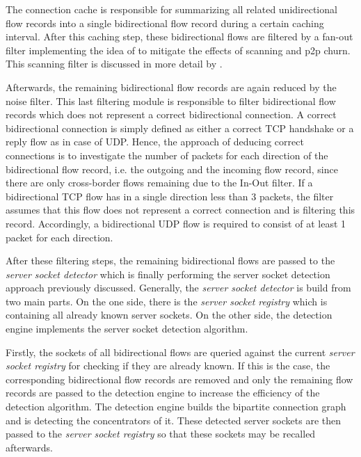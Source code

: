The connection cache is responsible for summarizing all related unidirectional flow records into a single bidirectional flow record during a certain caching interval. After this caching step, these bidirectional flows are filtered by a fan-out filter implementing the idea of \citet{Allman:2007} to mitigate the effects of scanning and \gls{p2p} churn. This scanning filter is discussed in more detail by \citet{Schatzmann:Mining,Schatzmann:Dissection,Schatzmann:Tracing}.

Afterwards, the remaining bidirectional flow records are again reduced by the noise filter. This last filtering module is responsible to filter bidirectional flow records which does not represent a correct bidirectional connection. A correct bidirectional connection is simply defined as either a correct \gls{TCP} handshake or a reply flow as in case of \gls{UDP}. Hence, the approach of deducing correct connections is to investigate the number of packets for each direction of the bidirectional flow record, i.e. the outgoing and the incoming flow record, since there are only cross-border flows remaining due to the In-Out filter. 
If a bidirectional \gls{TCP} flow has in a single direction less than 3 packets, the filter assumes that this flow does not represent a correct connection and is filtering this record. Accordingly, a bidirectional \gls{UDP} flow is required to consist of at least 1 packet for each direction. 

After these filtering steps, the remaining bidirectional flows are passed to the \emph{server socket detector} which is finally performing the \gls{server socket} detection approach previously discussed. Generally, the \emph{server socket detector} is build from two main parts. On the one side, there is the \emph{server socket registry} which is containing all already known \glspl{server socket}. 
On the other side, the detection engine implements the \gls{server socket} detection algorithm.

Firstly, the sockets of all bidirectional flows are queried against the current \emph{server socket registry} for checking if they are already known. If this is the case, the corresponding bidirectional flow records are removed and only the remaining flow records are passed to the detection engine to increase the efficiency of the detection algorithm. The detection engine builds the bipartite connection graph and is detecting the concentrators of it. These detected \glspl{server socket} are then passed to the \emph{server socket registry} so that these sockets may be recalled afterwards.

